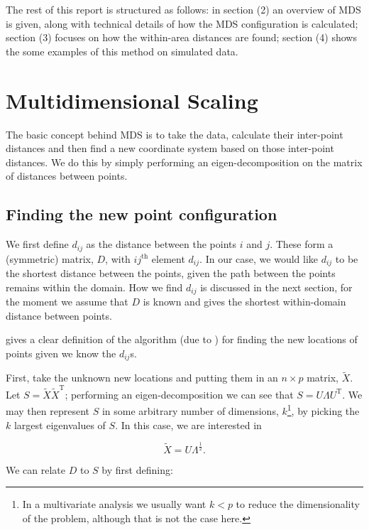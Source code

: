 \documentclass[a4paper,10pt]{amsart}
\newcommand{\tr}[1]{#1^{\text{T}}}
\begin{document}
The rest of this report is structured as follows: in section (2) an overview of MDS is given, along with technical details of how the MDS configuration is calculated; section (3) focuses on how the within-area distances are found; section (4) shows the some examples of this method on simulated data.

\section{Multidimensional Scaling}

The basic concept behind MDS is to take the data, calculate their inter-point distances and then find a new coordinate system based on those inter-point distances. We do this by simply performing an eigen-decomposition on the matrix of distances between points.

\subsection{Finding the new point configuration}

We first define $d_{ij}$ as the distance between the points $i$ and $j$. These form a (symmetric) matrix, $D$, with $ij^{\text{th}}$ element $d_{ij}$. In our case, we would like $d_{ij}$ to be the shortest distance between the points, given the path between the points remains within the domain. How we find $d_{ij}$ is discussed in the next section, for the moment we assume that $D$ is known and gives the shortest within-domain distance between points.

\cite{diaconis08} gives a clear definition of the algorithm (due to \cite{schoenberg35}) for finding the new locations of points given we know the $d_{ij}$s. 

First, take the unknown new locations and putting them in an $n \times p$ matrix, $\tilde{X}$. Let $S=\tilde{X}\tr{\tilde{X}}$; performing an eigen-decomposition we can see that $S=U\Lambda\tr{U}$. We may then represent $S$ in some arbitrary number of dimensions, $k$\footnote{In a multivariate analysis we usually want $k<p$ to reduce the dimensionality of the problem, although that is not the case here.}, by picking the $k$ largest eigenvalues of $S$. In this case, we are interested in

\begin{equation}
\tilde{X}=U\Lambda^{\frac{1}{2}}.
\end{equation}

We can relate $D$ to $S$ by first defining:
\end{document}
